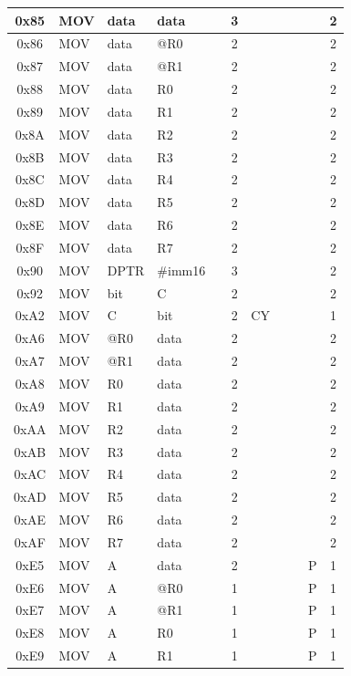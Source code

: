 \documentclass[a4paper,twoside,12pt]{book}
\begin{document}
{\begin{longtable}{|c|l|lll|c|llll|c|}
		0x85	& MOV	& data	& data	&	& 3	&	&	&	&	& 2	\\\hline
		0x86	& MOV	& data	& @R0	&	& 2	&	&	&	&	& 2	\\\hline
		0x87	& MOV	& data	& @R1	&	& 2	&	&	&	&	& 2	\\\hline
		0x88	& MOV	& data	& R0	&	& 2	&	&	&	&	& 2	\\\hline
		0x89	& MOV	& data	& R1	&	& 2	&	&	&	&	& 2	\\\hline
		0x8A	& MOV	& data	& R2	&	& 2	&	&	&	&	& 2	\\\hline
		0x8B	& MOV	& data	& R3	&	& 2	&	&	&	&	& 2	\\\hline
		0x8C	& MOV	& data	& R4	&	& 2	&	&	&	&	& 2	\\\hline
		0x8D	& MOV	& data	& R5	&	& 2	&	&	&	&	& 2	\\\hline
		0x8E	& MOV	& data	& R6	&	& 2	&	&	&	&	& 2	\\\hline
		0x8F	& MOV	& data	& R7	&	& 2	&	&	&	&	& 2	\\\hline
		0x90	& MOV	& DPTR	&\#imm16&	& 3	&	&	&	&	& 2	\\\hline
		0x92	& MOV	& bit	& C	&	& 2	&	&	&	&	& 2	\\\hline
		0xA2	& MOV	& C	& bit	&	& 2	& CY	&	&	&	& 1	\\\hline
		0xA6	& MOV	& @R0	& data	&	& 2	&	&	&	&	& 2	\\\hline
		0xA7	& MOV	& @R1	& data	&	& 2	&	&	&	&	& 2	\\\hline
		0xA8	& MOV	& R0	& data	&	& 2	&	&	&	&	& 2	\\\hline
		0xA9	& MOV	& R1	& data	&	& 2	&	&	&	&	& 2	\\\hline
		0xAA	& MOV	& R2	& data	&	& 2	&	&	&	&	& 2	\\\hline
		0xAB	& MOV	& R3	& data	&	& 2	&	&	&	&	& 2	\\\hline
		0xAC	& MOV	& R4	& data	&	& 2	&	&	&	&	& 2	\\\hline
		0xAD	& MOV	& R5	& data	&	& 2	&	&	&	&	& 2	\\\hline
		0xAE	& MOV	& R6	& data	&	& 2	&	&	&	&	& 2	\\\hline
		0xAF	& MOV	& R7	& data	&	& 2	&	&	&	&	& 2	\\\hline
		0xE5	& MOV	& A	& data	&	& 2	&	&	&	& P	& 1	\\\hline
		0xE6	& MOV	& A	& @R0	&	& 1	&	&	&	& P	& 1	\\\hline
		0xE7	& MOV	& A	& @R1	&	& 1	&	&	&	& P	& 1	\\\hline
		0xE8	& MOV	& A	& R0	&	& 1	&	&	&	& P	& 1	\\\hline
		0xE9	& MOV	& A	& R1	&	& 1	&	&	&	& P	& 1	\\\hline

\end{longtable}}
\end{document}
